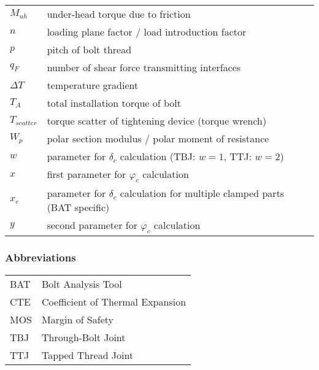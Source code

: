 \begin{longtable}{p{2cm} l}
  $M_{uh}$ & under-head torque due to friction \\
  $n$ & loading plane factor / load introduction factor \\
  $p$ & pitch of bolt thread \\
  $q_F$ & number of shear force transmitting interfaces \\
  $\Delta T$ & temperature gradient \\
  $T_A$ & total installation torque of bolt \\
  $T_{scatter}$ & torque scatter of tightening device (torque wrench) \\
  $W_p$ & polar section modulus / polar moment of resistance \\
  $w$ & parameter for $\delta_c$ calculation (TBJ: $w=1$, TTJ: $w=2$) \\
  $x$ & first parameter for $\varphi_c$ calculation \\
  $x_c$ & parameter for $\delta_c$ calculation for multiple clamped parts (BAT specific) \\
  $y$ & second parameter for $\varphi_c$ calculation \\
\end{longtable}

\subsubsection*{Abbreviations}
\begin{tabular}{p{3cm} l}
  BAT & Bolt Analysis Tool \\
  CTE & Coefficient of Thermal Expansion \\
  MOS & Margin of Safety \\
  TBJ & Through-Bolt Joint \\
  TTJ & Tapped Thread Joint \\
\end{tabular}